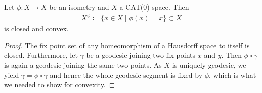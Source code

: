 \begin{prop}
  Let \(\phi \colon X \to X\) be an isometry and \(X\) a CAT(0) space. Then
  \begin{align*}
    X^\phi \coloneqq \{x \in X \mid \phi(x) = x\} \subset X
  \end{align*}
  is closed and convex.
\end{prop}

\begin{proof}
  The fix point set of any homeomorphism of a Hausdorff space to itself is closed. Furthermore, let \(\gamma\) be a geodesic joining two fix points \(x\) and \(y\). Then \(\phi \circ \gamma\) is again a geodesic joining the same two points. As \(X\) is uniquely geodesic, we yield \(\gamma = \phi \circ \gamma\) and hence the whole geodesic segment is fixed by \(\phi\), which is what we needed to show for convexity.
\end{proof}

